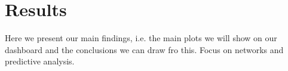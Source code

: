 \section{Results}
Here we present our main findings, i.e. the main plots we will show on our dashboard and the conclusions we can draw fro this. Focus on networks and predictive analysis.